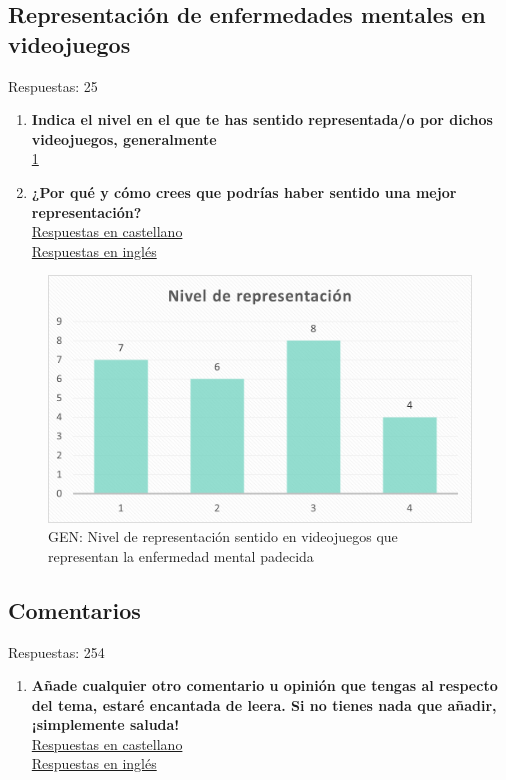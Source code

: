 \documentclass[12pt, a4paper,twoside,titlepage]{book}
\begin{document}
\subsection{Representación de enfermedades mentales en videojuegos}
Respuestas: 25
\begin{enumerate}[label=\textbf{\arabic*}.]
     \item \textbf{Indica el nivel en el que te has sentido representada/o por dichos videojuegos, generalmente}\\
     \ref{fig:GENNivel}
     \item \textbf{¿Por qué y cómo crees que podrías haber sentido una mejor representación?}\\
     \hyperref[representacionCastellano]{Respuestas en castellano}\\
     \hyperref[representacionIngles]{Respuestas en inglés}
\end{enumerate}

\begin{figure}
    \centering
    \includegraphics[width=.8\linewidth]{ANEXO Gen/29AnexGENnivel}
    \caption{GEN: Nivel de representación sentido en videojuegos que representan la enfermedad mental padecida}
    \label{fig:GENNivel}
\end{figure}


\subsection{Comentarios}
Respuestas: 254
\begin{enumerate}[label=\textbf{\arabic*}.]
     \item \textbf{Añade cualquier otro comentario u opinión que tengas al respecto del tema, estaré encantada de leera. Si no tienes nada que añadir, ¡simplemente saluda!}\\
     \hyperref[comentariosCastellano]{Respuestas en castellano}\\
     \hyperref[comentariosIngles]{Respuestas en inglés}
\end{enumerate}
\end{document}
